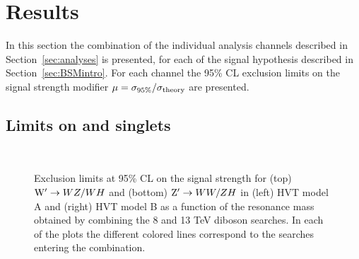 \section{Results}\label{sec:comboResults}

In this section the combination of the individual analysis channels described in Section~\ref{sec:analyses} is presented, for each of the signal hypothesis described in Section~\ref{sec:BSMintro}.
For each channel the 95\% CL exclusion limits on the signal strength modifier $\mu = \sigma_{95\%}/\sigma_{\rm theory}$ are presented.

\subsection{Limits on \Wpr and \Zpr singlets}

\begin{figure}[!htb]
\centering
{}
\\
\caption{%
Exclusion limits at 95\% CL on the signal strength for (top) $\mathrm{W}^\prime \rightarrow WZ/WH$ and (bottom) $\mathrm{Z}^\prime \rightarrow WW/ZH$ in (left) HVT model A and (right) HVT model B as a function of the resonance mass obtained by combining the 8 and 13 TeV diboson searches. In each of the plots the different colored lines correspond to the searches entering the combination.}
\label{fig:wpall_138TeV}
\end{figure}

